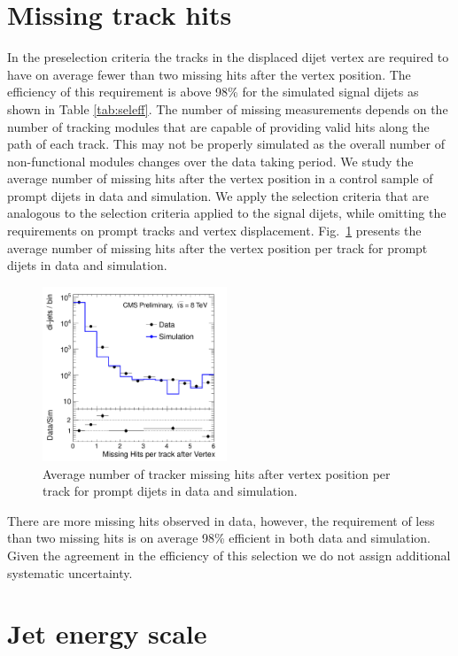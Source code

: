 \section{Missing track hits}

In the preselection criteria the tracks in the displaced dijet vertex are required to have on average
 fewer than two missing hits after the vertex position. The efficiency of this requirement is above 98\% 
for the simulated signal dijets as shown in Table \ref{tab:seleff}. 
The number of missing measurements depends on the number of tracking modules that are capable of providing
valid hits along the path of each track. This may not be properly simulated as the overall number of 
non-functional modules changes over the data taking period. We study the average number of missing
hits after the vertex position in a control sample of prompt dijets in data and simulation. We apply the selection criteria that are analogous to the selection criteria applied to the signal
dijets,
 while omitting the requirements on prompt tracks and vertex displacement. Fig.~\ref{fig:misshits} presents
the average number of missing hits after the vertex position per track for prompt dijets in data and simulation.

\begin{figure}[htbp]
\centering
\includegraphics[width=0.49\textwidth]{plots/misshits/misshits.pdf}
\caption{Average number of tracker missing hits after vertex position per track for prompt dijets
in data and simulation.\label{fig:misshits}}
\end{figure}

There are more missing hits observed in data, however, the requirement of less than two
missing hits is on average 98\% efficient in both data and simulation. Given the agreement in the efficiency
of this selection we do not assign additional systematic uncertainty. 

\section{Jet energy scale}
\label{sec:jessys}

